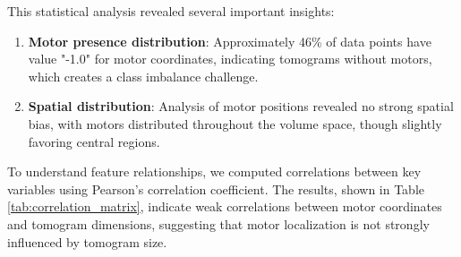 \documentclass{article}
\begin{document}
\begin{table}[htb]
    \centering
    \caption{Statistical summary of key dataset features}
    \label{tab:dataset_statistics}
\end{table}

This statistical analysis revealed several important insights:

\begin{enumerate}
    \item \textbf{Motor presence distribution}: Approximately 46\% of data points have value "-1.0" for motor coordinates, indicating tomograms without motors, which creates a class imbalance challenge.    
    \item \textbf{Spatial distribution}: Analysis of motor positions revealed no strong spatial bias, with motors distributed throughout the volume space, though slightly favoring central regions.
\end{enumerate}

To understand feature relationships, we computed correlations between key variables using Pearson's correlation coefficient. The results, shown in Table \ref{tab:correlation_matrix}, indicate weak correlations between motor coordinates and tomogram dimensions, suggesting that motor localization is not strongly influenced by tomogram size.
\end{document}
